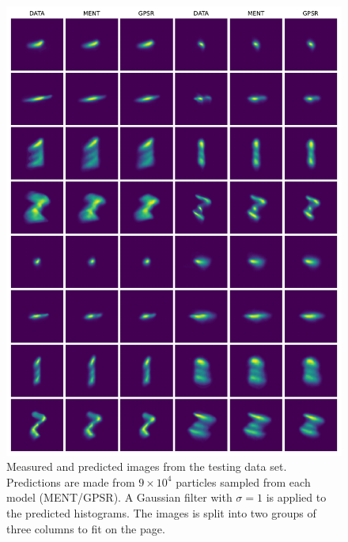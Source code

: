 \documentclass[%
    reprint,
    onecolumn,
    nofootinbib,
    amsmath,
    amssymb,
    aps,
    prstab,
]{revtex4-2}
\begin{document}
%
\begin{figure}
    \centering
    \includegraphics[width=0.66\linewidth]{fig_compare_data_test.pdf}
    \caption{Measured and predicted images from the testing data set. Predictions are made from $9 \times 10^4$ particles sampled from each model (MENT/GPSR). A Gaussian filter with $\sigma = 1$ is applied to the predicted histograms. The images is split into two groups of three columns to fit on the page.}
    \label{fig:data-train}
\end{figure}
%
\end{document}
